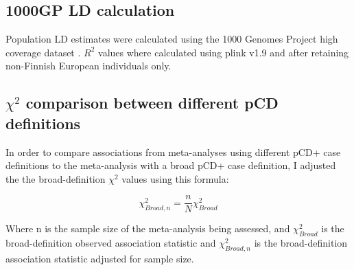\subsection{1000GP LD calculation}
Population LD estimates were calculated using the 1000 Genomes Project high coverage dataset \cite{1000gphc}. $R^{2}$ values where calculated using plink v1.9 and after retaining non-Finnish European individuals only. 

\subsection{$\chi^{2}$ comparison between different pCD definitions}
In order to compare associations from meta-analyses using different pCD+ case definitions to the meta-analysis with a broad pCD+ case definition, I adjusted the the broad-definition $\chi^{2}$ values using this formula:

 $$\chi^{2}_{Broad,n}=\frac{n}{N}\chi^{2}_{Broad}$$

Where n is the sample size of the meta-analysis being assessed, and $\chi^{2}_{Broad}$ is the broad-definition observed association statistic and  $\chi^{2}_{Broad,n}$ is the broad-definition association statistic adjusted for sample size. 





